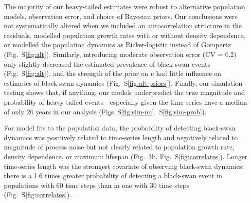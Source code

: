 The majority of our heavy-tailed estimates were robust to alternative
population models, observation error, and choice of Bayesian priors. Our
conclusions were not systematically altered when we included an autocorrelation
structure in the residuals, modelled population growth rates with or without
density dependence, or modelled the population dynamics as Ricker-logistic
instead of Gompertz (Fig.~S\ref{fig:alt}). Similarly, introducing moderate
observation error (CV = 0.2) only slightly decreased the estimated prevalence
of black-swan events (Fig.~S\ref{fig:alt}), and the strength of the prior on
\(\nu\) had little influence on estimates of black-swan dynamics
(Fig.~S\ref{fig:alt-priors}). Finally, our simulation testing shows that, if
anything, our models underpredict the true magnitude and probability of
heavy-tailed events---especially given the time series have a median of only 26
years in our analysis (Figs~S\ref{fig:sim-nu},~S\ref{fig:sim-prob}).


For model fits to the population data, the probability of detecting black-swan
dynamics was positively related to time-series length and negatively related to
magnitude of process noise but not clearly related to population growth rate,
density dependence, or maximum lifespan (Fig.~3b, Fig.~S\ref{fig:correlates}).
Longer time-series length was the strongest covariate of observing black-swan
dynamics: there is a 1.6 times greater probability of detecting a black-swan
event in populations with 60 time steps than in one with 30 time steps
(Fig.~S\ref{fig:correlates}).

